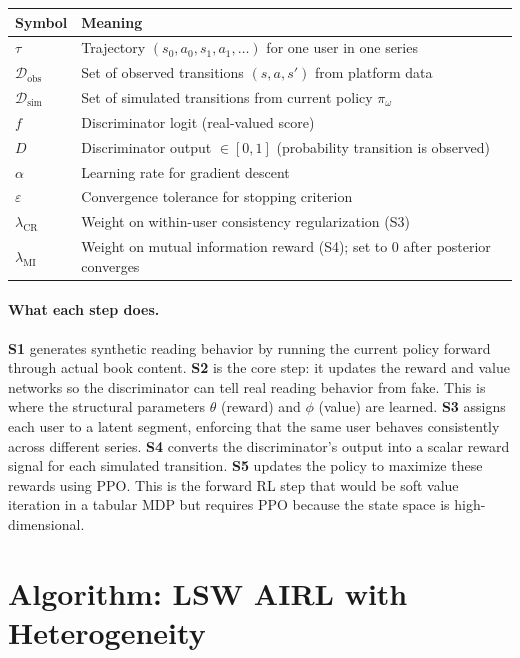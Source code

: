 \documentclass[11pt]{article}
\begin{document}
\begin{table}[h!]
\centering\small
\begin{tabular}{ll}
\toprule
Symbol & Meaning \\
\midrule
$\tau$ & Trajectory $(s_0, a_0, s_1, a_1, \ldots)$ for one user in one series \\
$\mathcal{D}_{\text{obs}}$ & Set of observed transitions $(s, a, s')$ from platform data \\
$\mathcal{D}_{\text{sim}}$ & Set of simulated transitions from current policy $\pi_\omega$ \\
$f$ & Discriminator logit (real-valued score) \\
$D$ & Discriminator output $\in [0, 1]$ (probability transition is observed) \\
$\alpha$ & Learning rate for gradient descent \\
$\varepsilon$ & Convergence tolerance for stopping criterion \\
$\lambda_{\text{CR}}$ & Weight on within-user consistency regularization (S3) \\
$\lambda_{\text{MI}}$ & Weight on mutual information reward (S4); set to 0 after posterior converges \\
\bottomrule
\end{tabular}
\end{table}

\paragraph{What each step does.}
\textbf{S1} generates synthetic reading behavior by running the current policy forward through actual book content.
\textbf{S2} is the core step: it updates the reward and value networks so the discriminator can tell real reading behavior from fake. This is where the structural parameters $\theta$ (reward) and $\phi$ (value) are learned.
\textbf{S3} assigns each user to a latent segment, enforcing that the same user behaves consistently across different series.
\textbf{S4} converts the discriminator's output into a scalar reward signal for each simulated transition.
\textbf{S5} updates the policy to maximize these rewards using PPO. This is the forward RL step that would be soft value iteration in a tabular MDP but requires PPO because the state space is high-dimensional.

\newpage
\section*{Algorithm: LSW AIRL with Heterogeneity}
\end{document}

